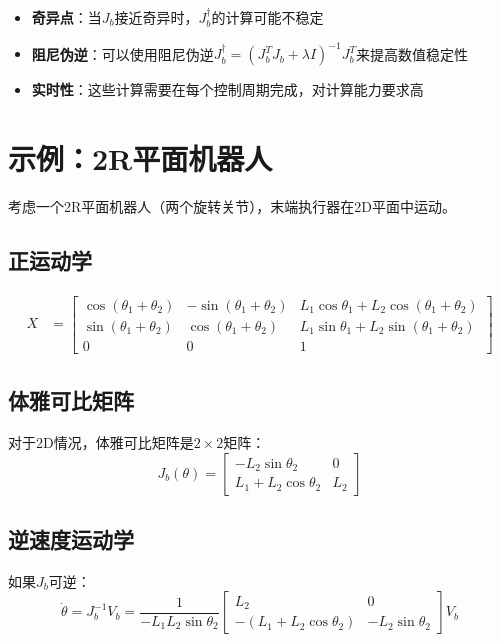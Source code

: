 \documentclass{article}
\begin{document}
\begin{itemize}
\item \textbf{奇异点}：当$J_b$接近奇异时，$J_b^{\dagger}$的计算可能不稳定
\item \textbf{阻尼伪逆}：可以使用阻尼伪逆$J_b^{\dagger} = (J_b^T J_b + \lambda I)^{-1}J_b^T$来提高数值稳定性
\item \textbf{实时性}：这些计算需要在每个控制周期完成，对计算能力要求高
\end{itemize}

\section{示例：2R平面机器人}

考虑一个2R平面机器人（两个旋转关节），末端执行器在2D平面中运动。

\subsection{正运动学}

\begin{align}
X &= \begin{bmatrix}
\cos(\theta_1 + \theta_2) & -\sin(\theta_1 + \theta_2) & L_1\cos\theta_1 + L_2\cos(\theta_1+\theta_2) \\
\sin(\theta_1 + \theta_2) & \cos(\theta_1 + \theta_2) & L_1\sin\theta_1 + L_2\sin(\theta_1+\theta_2) \\
0 & 0 & 1
\end{bmatrix}
\end{align}

\subsection{体雅可比矩阵}

对于2D情况，体雅可比矩阵是$2 \times 2$矩阵：
\begin{equation}
J_b(\theta) = \begin{bmatrix}
-L_2\sin\theta_2 & 0 \\
L_1 + L_2\cos\theta_2 & L_2
\end{bmatrix}
\end{equation}

\subsection{逆速度运动学}

如果$J_b$可逆：
\begin{equation}
\dot{\theta} = J_b^{-1}V_b = \frac{1}{-L_1L_2\sin\theta_2}\begin{bmatrix}
L_2 & 0 \\
-(L_1 + L_2\cos\theta_2) & -L_2\sin\theta_2
\end{bmatrix}V_b
\end{equation}
\end{document}
